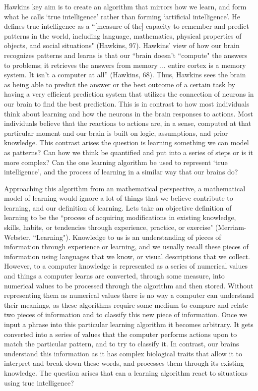 \documentclass[11pt, oneside]{article}
\begin{document}
\par Hawkins key aim is to create an algorithm that mirrors how we learn, and form what he calls `true intelligence' rather than forming `artificial intelligence'. He defines true intelligence as a ``[measure of the] capacity to remember and predict patterns in the world, including language, mathematics, physical properties of objects, and social situations" (Hawkins, 97). Hawkins' view of how our brain recognizes patterns and learns is that our ``brain doesn't ``compute" the answers to problems; it retrieves the answers from memory ... entire cortex is a memory system. It isn't a computer at all'' (Hawkins, 68). Thus, Hawkins sees the brain as being able to predict the answer or the best outcome of a certain task by having a very efficient prediction system that utilizes the connection of neurons in our brain to find the best prediction. This is in contrast to how most individuals think about learning and how the neurons in the brain responses to actions. Most individuals believe that the reactions to actions are, in a sense, computed at that particular moment and our brain is built on logic, assumptions, and prior knowledge. This contrast arises the question is learning something we can model as patterns? Can how we think be quantified and put into a series of steps or is it more complex? Can the one learning algorithm be used to represent `true intelligence', and the process of learning in a similar way that our brains do?

\par 
Approaching this algorithm from an mathematical perspective, a mathematical model of learning would ignore a lot of things that we believe contribute to learning, and our definition of learning. Lets take an objective definition of learning to be the ``process of acquiring modifications in existing knowledge, skills, habits, or tendencies through experience, practice, or exercise" (Merriam-Webster, ``Learning"). 
Knowledge to us is an understanding of pieces of information through experience or learning, and we usually recall these pieces of information using languages that we know, or visual descriptions that we collect. However, to a computer knowledge is represented as a series of numerical values and things a computer learns are converted, through some measure, into numerical values to be processed through the algorithm and then stored. 
Without representing them as numerical values there is no way a computer can understand their meanings, as these algorithms require some medium to compare and relate two pieces of information and to classify this new piece of information. 
Once we input a phrase into this particular learning algorithm it becomes arbitrary. It gets converted into a series of values that the computer performs actions upon to match the particular pattern, and to try to classify it. 
In contrast, our brains understand this information as it has complex biological traits that allow it to interpret and break down these words, and processes them through its existing knowledge. The question arises that can a learning algorithm react to situations using true intelligence? 
\end{document}
